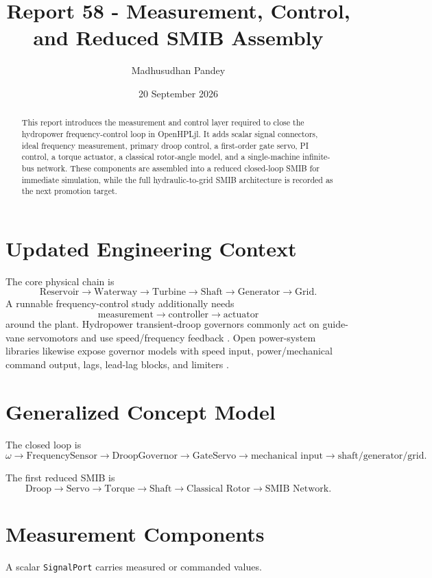 \documentclass[10pt,a4paper]{article}
\title{Report 58 - Measurement, Control, and Reduced SMIB Assembly}
\author{Madhusudhan Pandey}
\date{20 September 2026}
\begin{document}
\maketitle
\begin{abstract}
This report introduces the measurement and control layer required to close the hydropower frequency-control loop in OpenHPLjl. It adds scalar signal connectors, ideal frequency measurement, primary droop control, a first-order gate servo, PI control, a torque actuator, a classical rotor-angle model, and a single-machine infinite-bus network. These components are assembled into a reduced closed-loop SMIB for immediate simulation, while the full hydraulic-to-grid SMIB architecture is recorded as the next promotion target.
\end{abstract}

\section{Updated Engineering Context}
The core physical chain is
\[
\text{Reservoir}\rightarrow\text{Waterway}\rightarrow\text{Turbine}
\rightarrow\text{Shaft}\rightarrow\text{Generator}\rightarrow\text{Grid}.
\]
A runnable frequency-control study additionally needs
\[
\boxed{\text{measurement}\rightarrow\text{controller}\rightarrow\text{actuator}}
\]
around the plant. Hydropower transient-droop governors commonly act on guide-vane servomotors and use speed/frequency feedback \cite{OpenHPLThesis}. Open power-system libraries likewise expose governor models with speed input, power/mechanical command output, lags, lead-lag blocks, and limiters \cite{GOVPSAT,TGOV1}.

\section{Generalized Concept Model}
The closed loop is
\[
\omega \rightarrow \text{FrequencySensor}
\rightarrow \text{DroopGovernor}
\rightarrow \text{GateServo}
\rightarrow \text{mechanical input}
\rightarrow \text{shaft/generator/grid}.
\]

The first reduced SMIB is
\[
\boxed{
\text{Droop}\rightarrow\text{Servo}\rightarrow\text{Torque}
\rightarrow\text{Shaft}\rightarrow\text{Classical Rotor}
\rightarrow\text{SMIB Network}
}.
\]

\section{Measurement Components}
A scalar \texttt{SignalPort} carries measured or commanded values.
\end{document}
